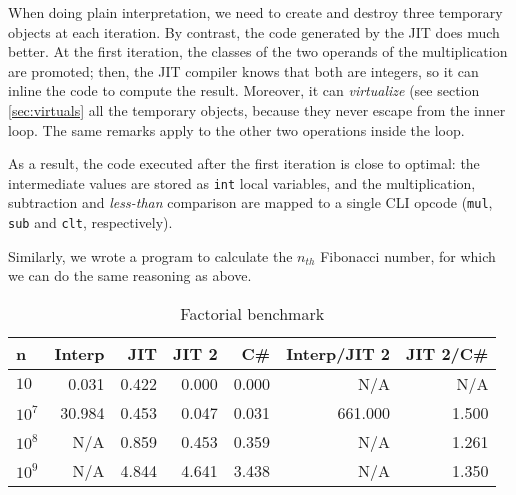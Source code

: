
When doing plain interpretation, we need to create and destroy three temporary
objects at each iteration.  By contrast, the code generated by the JIT does
much better.  At the first iteration, the classes of the two operands of the
multiplication are promoted; then, the JIT compiler knows that both are
integers, so it can inline the code to compute the result.  Moreover, it can
\emph{virtualize} (see section \ref{sec:virtuals} all the temporary objects, because they never escape from
the inner loop.  The same remarks apply to the other two operations inside
the loop.

As a result, the code executed after the first iteration is close to optimal:
the intermediate values are stored as \lstinline{int} local variables, and the
multiplication, subtraction and \emph{less-than} comparison are mapped to a
single CLI opcode (\lstinline{mul}, \lstinline{sub} and \lstinline{clt},
respectively).

Similarly, we wrote a program to calculate the $n_{th}$ Fibonacci number, for
which we can do the same reasoning as above.



\begin{table}[ht]
  \begin{tabular}{|l|r|r|r|r||r|r|}
    \hline
    \textbf{n} & 
    \textbf{Interp} &
    \textbf{JIT} &
    \textbf{JIT 2} &
    \textbf{C\#} &
    \textbf{Interp/JIT 2} &
    \textbf{JIT 2/C\#} \\
    \hline

    $10$    &   0.031  &  0.422  &  0.000  &  0.000  &      N/A  &    N/A \\
    $10^7$  &  30.984  &  0.453  &  0.047  &  0.031  &  661.000  &  1.500 \\
    $10^8$  &     N/A  &  0.859  &  0.453  &  0.359  &      N/A  &  1.261 \\
    $10^9$  &     N/A  &  4.844  &  4.641  &  3.438  &      N/A  &  1.350 \\

    \hline

  \end{tabular}
  \caption{Factorial benchmark}
  \label{tab:factorial}
\end{table}


